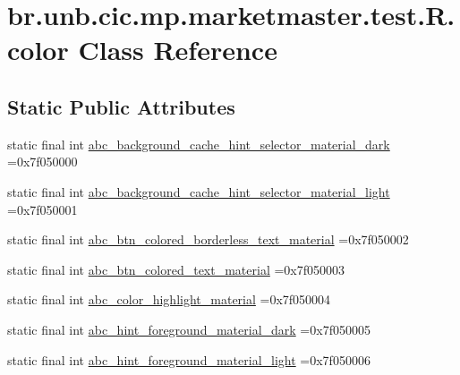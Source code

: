 \hypertarget{classbr_1_1unb_1_1cic_1_1mp_1_1marketmaster_1_1test_1_1R_1_1color}{}\section{br.\+unb.\+cic.\+mp.\+marketmaster.\+test.\+R.\+color Class Reference}
\label{classbr_1_1unb_1_1cic_1_1mp_1_1marketmaster_1_1test_1_1R_1_1color}
\subsection*{Static Public Attributes}
\begin{DoxyCompactItemize}
\item 
static final int \mbox{\hyperlink{classbr_1_1unb_1_1cic_1_1mp_1_1marketmaster_1_1test_1_1R_1_1color_a91e2cf6e9dcd65b74c4de52902162c22}{abc\+\_\+background\+\_\+cache\+\_\+hint\+\_\+selector\+\_\+material\+\_\+dark}} =0x7f050000
\item 
static final int \mbox{\hyperlink{classbr_1_1unb_1_1cic_1_1mp_1_1marketmaster_1_1test_1_1R_1_1color_a1836abaf7b9de4e0dfb76eeb04564b13}{abc\+\_\+background\+\_\+cache\+\_\+hint\+\_\+selector\+\_\+material\+\_\+light}} =0x7f050001
\item 
static final int \mbox{\hyperlink{classbr_1_1unb_1_1cic_1_1mp_1_1marketmaster_1_1test_1_1R_1_1color_acd01d9d6e1895010448747d76cb39683}{abc\+\_\+btn\+\_\+colored\+\_\+borderless\+\_\+text\+\_\+material}} =0x7f050002
\item 
static final int \mbox{\hyperlink{classbr_1_1unb_1_1cic_1_1mp_1_1marketmaster_1_1test_1_1R_1_1color_a06ca11cb62f3d5d2fa92ad507a75627b}{abc\+\_\+btn\+\_\+colored\+\_\+text\+\_\+material}} =0x7f050003
\item 
static final int \mbox{\hyperlink{classbr_1_1unb_1_1cic_1_1mp_1_1marketmaster_1_1test_1_1R_1_1color_a11f7f1a0838284117675977bd44901c5}{abc\+\_\+color\+\_\+highlight\+\_\+material}} =0x7f050004
\item 
static final int \mbox{\hyperlink{classbr_1_1unb_1_1cic_1_1mp_1_1marketmaster_1_1test_1_1R_1_1color_a61adfd8e84b4312ff4e92b296ed97077}{abc\+\_\+hint\+\_\+foreground\+\_\+material\+\_\+dark}} =0x7f050005
\item 
static final int \mbox{\hyperlink{classbr_1_1unb_1_1cic_1_1mp_1_1marketmaster_1_1test_1_1R_1_1color_aee5cb151a1dab66a4c2505402625f0b4}{abc\+\_\+hint\+\_\+foreground\+\_\+material\+\_\+light}} =0x7f050006
\item 

\end{DoxyCompactItemize}
